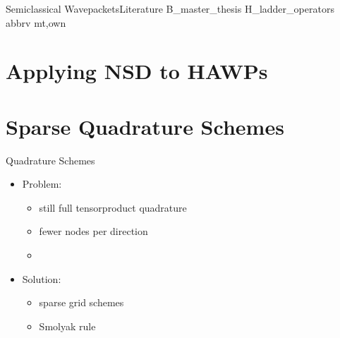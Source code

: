 \documentclass{beamer}
\begin{document}
\begin{frame}{Semiclassical Wavepackets}{Literature}
  \nocite{hawp}{B_master_thesis}
  \nocite{hawp}{H_ladder_operators}
  \scriptsize
  {abbrv}
  {mt,own}{}
\end{frame}


\section{Applying NSD to HAWPs}












\section{Sparse Quadrature Schemes}

\begin{frame}{Quadrature Schemes}
  \begin{itemize}
  \item Problem:
    \begin{itemize}
    \item still full tensorproduct quadrature
    \item fewer nodes per direction
    \item
    \end{itemize}
  \end{itemize}
  \vspace{0.2cm}
  \begin{itemize}
  \item Solution:
    \begin{itemize}
    \item sparse grid schemes
    \item Smolyak rule
    \end{itemize}
  \end{itemize}
\end{frame}
\end{document}
